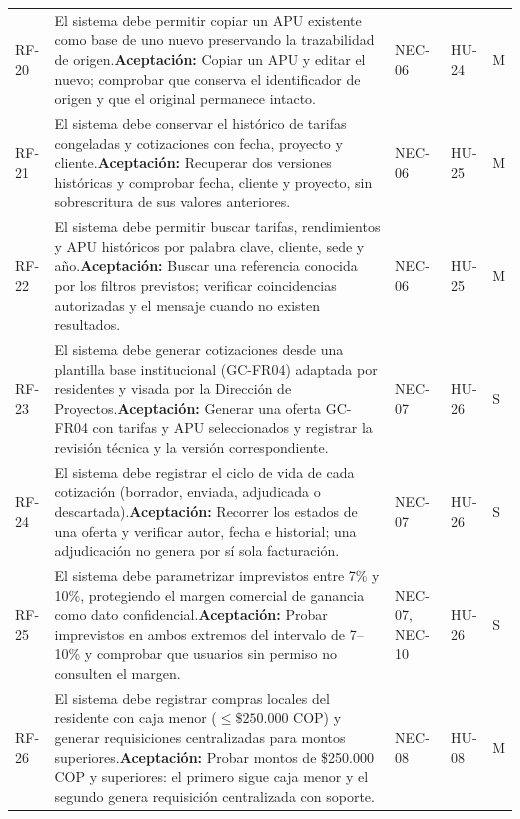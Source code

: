 \documentclass[12pt,letterpaper]{article}
\begin{document}
{\begin{longtable}{@{}L{1.6cm}L{8.05cm}L{2.0cm}L{1.5cm}L{1.2cm}@{}}
RF-20 & El sistema debe permitir copiar un APU existente como base de uno nuevo preservando la trazabilidad de origen.\newline \textbf{Aceptación:} Copiar un APU y editar el nuevo; comprobar que conserva el identificador de origen y que el original permanece intacto. & NEC-06 & HU-24 & M\\
RF-21 & El sistema debe conservar el histórico de tarifas congeladas y cotizaciones con fecha, proyecto y cliente.\newline \textbf{Aceptación:} Recuperar dos versiones históricas y comprobar fecha, cliente y proyecto, sin sobrescritura de sus valores anteriores. & NEC-06 & HU-25 & M\\
RF-22 & El sistema debe permitir buscar tarifas, rendimientos y APU históricos por palabra clave, cliente, sede y año.\newline \textbf{Aceptación:} Buscar una referencia conocida por los filtros previstos; verificar coincidencias autorizadas y el mensaje cuando no existen resultados. & NEC-06 & HU-25 & M\\
RF-23 & El sistema debe generar cotizaciones desde una plantilla base institucional (GC-FR04) adaptada por residentes y visada por la Dirección de Proyectos.\newline \textbf{Aceptación:} Generar una oferta GC-FR04 con tarifas y APU seleccionados y registrar la revisión técnica y la versión correspondiente. & NEC-07 & HU-26 & S\\
RF-24 & El sistema debe registrar el ciclo de vida de cada cotización (borrador, enviada, adjudicada o descartada).\newline \textbf{Aceptación:} Recorrer los estados de una oferta y verificar autor, fecha e historial; una adjudicación no genera por sí sola facturación. & NEC-07 & HU-26 & S\\
RF-25 & El sistema debe parametrizar imprevistos entre 7\% y 10\%, protegiendo el margen comercial de ganancia como dato confidencial.\newline \textbf{Aceptación:} Probar imprevistos en ambos extremos del intervalo de 7--10\% y comprobar que usuarios sin permiso no consulten el margen. & NEC-07, NEC-10 & HU-26 & S\\
RF-26 & El sistema debe registrar compras locales del residente con caja menor ($\le \$250.000$ COP) y generar requisiciones centralizadas para montos superiores.\newline \textbf{Aceptación:} Probar montos de \$250.000 COP y superiores: el primero sigue caja menor y el segundo genera requisición centralizada con soporte. & NEC-08 & HU-08 & M\\

\end{longtable}}
\end{document}
